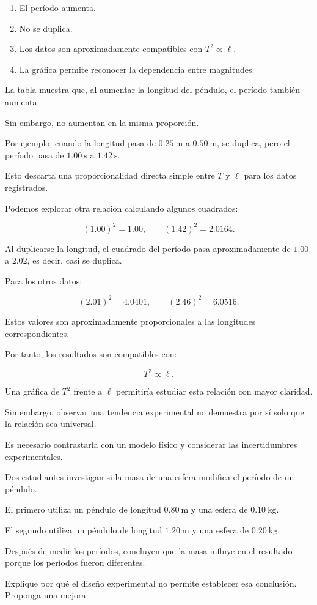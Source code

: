 \begin{respuesta}
\begin{enumerate}[label=\alph*)]
    \item El período aumenta.
    \item No se duplica.
    \item Los datos son aproximadamente compatibles con \(T^2\propto\ell\).
    \item La gráfica permite reconocer la dependencia entre magnitudes.
\end{enumerate}
\end{respuesta}

\begin{explicacion}
La tabla muestra que, al aumentar la longitud del péndulo, el período también aumenta.

Sin embargo, no aumentan en la misma proporción.

Por ejemplo, cuando la longitud pasa de \(\SI{0.25}{\meter}\) a \(\SI{0.50}{\meter}\), se duplica, pero el período pasa de \(\SI{1.00}{\second}\) a \(\SI{1.42}{\second}\).

Esto descarta una proporcionalidad directa simple entre \(T\) y \(\ell\) para los datos registrados.

Podemos explorar otra relación calculando algunos cuadrados:

\[(1.00)^2=1.00,\qquad (1.42)^2=2.0164.\]

Al duplicarse la longitud, el cuadrado del período pasa aproximadamente de \(1.00\) a \(2.02\), es decir, casi se duplica.

Para los otros datos:

\[(2.01)^2=4.0401,\qquad (2.46)^2=6.0516.\]

Estos valores son aproximadamente proporcionales a las longitudes correspondientes.

Por tanto, los resultados son compatibles con:

\[T^2\propto\ell.\]

Una gráfica de \(T^2\) frente a \(\ell\) permitiría estudiar esta relación con mayor claridad.

Sin embargo, observar una tendencia experimental no demuestra por sí solo que la relación sea universal.

Es necesario contrastarla con un modelo físico y considerar las incertidumbres experimentales.
\end{explicacion}


\begin{ejercicio}
Dos estudiantes investigan si la masa de una esfera modifica el período de un péndulo.

El primero utiliza un péndulo de longitud \(\SI{0.80}{\meter}\) y una esfera de \(\SI{0.10}{\kilogram}\).

El segundo utiliza un péndulo de longitud \(\SI{1.20}{\meter}\) y una esfera de \(\SI{0.20}{\kilogram}\).

Después de medir los períodos, concluyen que la masa influye en el resultado porque los períodos fueron diferentes.

Explique por qué el diseño experimental no permite establecer esa conclusión.
Proponga una mejora.
\end{ejercicio}

